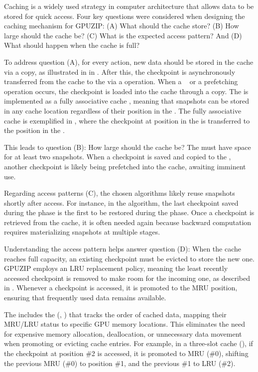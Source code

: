 \documentclass[Ingles,Final]{ic-tese-v3}
\begin{document}
Caching is a widely used strategy in computer architecture that allows data to be stored for quick access. Four key questions were considered when designing the caching mechanism for GPUZIP: (A) What should the cache store? (B) How large should the cache be? (C) What is the expected access pattern? And (D) What should happen when the cache is full?

To address question (A), for every \save action, new data should be stored in the cache via a \dtd copy, as illustrated in  in . After this, the checkpoint is asynchronously transferred from the cache to the \pool via a \dth operation. When a \restore~ or a prefetching
 operation occurs, the checkpoint is loaded into the cache through a \htd copy. The \cache is implemented as a fully associative cache \cite{patterson1995}, meaning that snapshots can be stored in any cache location regardless of their position in the \pool. The fully associative cache is exemplified in , where the checkpoint at position  in the \pool is transferred to the position  in the \cache.

This leads to question (B): How large should the cache be? The \cache must have space for at least two snapshots. When a checkpoint is saved and copied to the \pool, another checkpoint is likely being prefetched into the cache, awaiting imminent use. 

Regarding access patterns (C), the chosen \checkpointing algorithms likely reuse snapshots shortly after access. For instance, in the \revolve algorithm, the last checkpoint saved during the \fwd phase is the first to be restored during the \bwd phase. Once a checkpoint is retrieved from the cache, it is often needed again because backward computation requires materializing snapshots at multiple stages.

Understanding the access pattern helps answer question (D): When the cache reaches full capacity, an existing checkpoint must be evicted to store the new one. GPUZIP employs an LRU replacement policy, meaning the least recently accessed checkpoint is removed to make room for the incoming one, as described in \cite{butt2007}. Whenever a checkpoint is accessed, it is promoted to the MRU position, ensuring that frequently used data remains available.

The \cache includes the  (, ) that tracks the order of cached \checkpointing data, mapping their MRU/LRU status to specific GPU memory locations. This eliminates the need for expensive memory allocation, deallocation, or unnecessary data movement when promoting or evicting cache entries. For example, in a three-slot cache (), if the checkpoint at position \#2 is accessed, it is promoted to MRU (\#0), shifting the previous MRU (\#0) to position \#1, and the previous \#1 to LRU (\#2).
\end{document}
